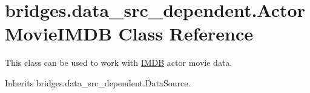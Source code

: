 \hypertarget{classbridges_1_1data__src__dependent_1_1_actor_movie_i_m_d_b}{}\section{bridges.\+data\+\_\+src\+\_\+dependent.\+Actor\+Movie\+I\+M\+DB Class Reference}
\label{classbridges_1_1data__src__dependent_1_1_actor_movie_i_m_d_b}


This class can be used to work with \mbox{\hyperlink{classbridges_1_1data__src__dependent_1_1_i_m_d_b}{I\+M\+DB}} actor movie data.  




Inherits bridges.\+data\+\_\+src\+\_\+dependent.\+Data\+Source.

